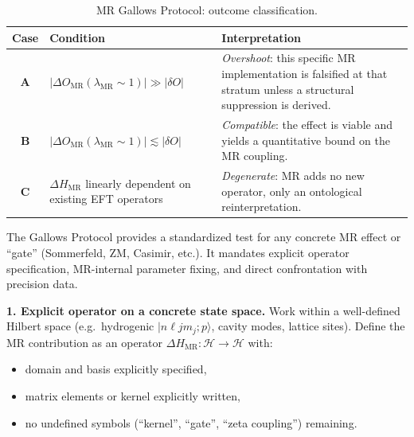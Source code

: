 \documentclass[11pt,a4paper]{article}
\begin{document}
\begin{table}[h]
\centering
\begin{tabularx}{\textwidth}{c>{\centering\arraybackslash}p{}>{\raggedright\arraybackslash}X}
\hline
\textbf{Case} & \textbf{Condition} & \textbf{Interpretation} \\
\hline
\textbf{A} &
$\bigl|\Delta O_{\mathrm{MR}}(\lambda_{\mathrm{MR}}\sim 1)\bigr| \gg |\delta O|$ &
\emph{Overshoot}: this specific MR implementation is falsified at that stratum
unless a structural suppression is derived. \\
\textbf{B} &
$\bigl|\Delta O_{\mathrm{MR}}(\lambda_{\mathrm{MR}}\sim 1)\bigr| \lesssim |\delta O|$ &
\emph{Compatible}: the effect is viable and yields a quantitative bound
on the MR coupling. \\
\textbf{C} &
$\Delta H_{\mathrm{MR}}$ linearly dependent on existing EFT operators &
\emph{Degenerate}: MR adds no new operator, only an ontological
reinterpretation. \\
\hline
\end{tabularx}
\caption{MR Gallows Protocol: outcome classification.}
\label{tab:gallows-cases}
\end{table}



\begin{tcolorbox}[title={Box X --- MR Gallows Protocol for Proposed Effects}, breakable]

The Gallows Protocol provides a standardized test for any concrete MR
effect or ``gate'' (Sommerfeld, ZM, Casimir, etc.). It mandates explicit
operator specification, MR-internal parameter fixing, and direct
confrontation with precision data.

\medskip
\noindent\textbf{1. Explicit operator on a concrete state space.}
Work within a well-defined Hilbert space (e.g.\ hydrogenic
$\lvert n\ell j m_j; p\rangle$, cavity modes, lattice sites). Define the
MR contribution as an operator
$\Delta H_{\mathrm{MR}} : \mathcal{H} \to \mathcal{H}$ with:
\begin{itemize}[nosep]
  \item domain and basis explicitly specified,
  \item matrix elements or kernel explicitly written,
  \item no undefined symbols (``kernel'', ``gate'', ``zeta coupling'') remaining.
\end{itemize}


\end{tcolorbox}
\end{document}
